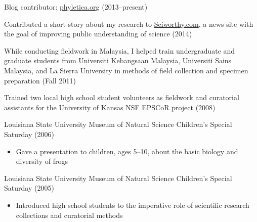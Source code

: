 \myHangIndent
Blog contributor:
\href{http://phyletica.org/posts/}{phyletica.org} (2013--present)

\myHangIndent
Contributed a short story about my research to
\href{http://sciworthy.com/science-news/science-authors/whos-the-living-fossil/}{Sciworthy.com},
a news site with the goal of improving public understanding of science (2014)

\myHangIndent
While conducting fieldwork in Malaysia, I helped train undergraduate and
graduate students from Universiti Kebangsaan Malaysia, Universiti Sains
Malaysia, and La Sierra University in methods of field collection and specimen
preparation (Fall 2011)

\myHangIndent
Trained two local high school student volunteers as fieldwork and curatorial
assistants for the University of Kansas NSF EPSCoR project (2008)

\myHangIndent
Louisiana State University Museum of Natural Science Children's Special
Saturday (2006)
\begin{itemize}
    \item Gave a presentation to children, ages 5--10, about the basic biology
        and diversity of frogs
\end{itemize}

\myHangIndent
Louisiana State University Museum of Natural Science Children's Special
Saturday (2005)
\begin{itemize}
    \item Introduced high school students to the imperative role of scientific
        research collections and curatorial methods
\end{itemize}

